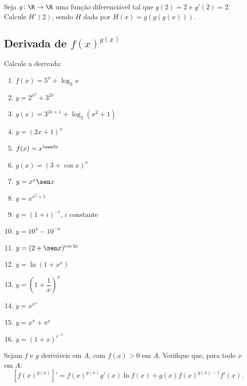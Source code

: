 \begin{exercicio}[30]
Seja $g\colon \R \to \R$ uma função diferenciável tal que $g(2) = 2$ e $g'(2) = 2$. Calcule $H'(2)$, sendo $H$ dada por $H(x) = g(g(g(x)))$.
\end{exercicio}

\clearpage

\subsection{Derivada de $f(x)^{g(x)}$}

\begin{exercicio}[1]
Calcule a derivada:
\begin{enumerate}[label=\alph*)]
    \item $f(x) = 5^x + \log_3 x$
    \item $y = 2^{x^2} + 3^{2x}$
    \item $g(x) = 3^{2x + 1} + \log_2 (x^2 + 1)$
    \item $y = (2x + 1)^x$
    \item $f(x) = x^{\sen 3x}$
    \item $g(x) = (3 + \cos x)^x$
    \item $y = x^x \sen x$
    \item $y = x^{x^2 + 1}$
    \item $y = (1 + i)^{-t}$, $i$ constante
    \item $y = 10^x - 10^{-x}$
    \item $y = (2 + \sen x)^{\cos 3x}$
    \item $y = \ln(1 + x^x)$
    \item $y = \left(1 + \dfrac{1}{x}\right)^{\!x}$
    \item $y = x^{x^x}$
    \item $y = x^\pi + \pi^x$
    \item $y = (1 + x)^{e^{-x}}$
\end{enumerate}
\end{exercicio}

\begin{exercicio}[2]
Sejam $f$ e $g$ deriváveis em $A$, com $f(x) > 0$ em $A$. Verifique que, para todo $x$ em $A$:
\[
[f(x)^{g(x)}]' = f(x)^{g(x)} g'(x) \ln f(x) + g(x) f(x)^{g(x) - 1} f'(x).
\]
\end{exercicio}

